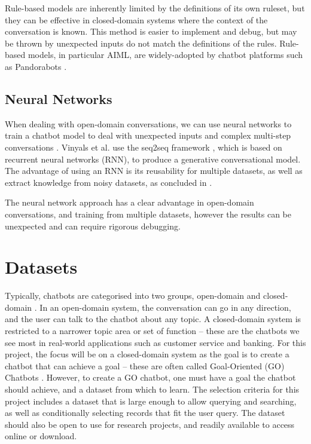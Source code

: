 Rule-based models are inherently limited by the definitions of its own ruleset, but they can be effective in closed-domain systems where the context of the conversation is known. This method is easier to implement and debug, but may be thrown by unexpected inputs do not match the definitions of the rules. Rule-based models, in particular AIML, are widely-adopted by chatbot platforms such as Pandorabots \cite{pandorabots2019about}.

\subsection{Neural Networks}
When dealing with open-domain conversations, we can use neural networks to train a chatbot model to deal with unexpected inputs and complex multi-step conversations \cite{vinyals2015neural}. Vinyals et al. use the seq2seq framework \cite{sutskever2014sequence}, which is based on recurrent neural networks (RNN), to produce a generative conversational model. The advantage of using an RNN is its reusability for multiple datasets, as well as extract knowledge from noisy datasets, as concluded in \cite{vinyals2015neural}.


The neural network approach has a clear advantage in open-domain conversations, and training from multiple datasets, however the results can be unexpected and can require rigorous debugging.

\newpage
\section{Datasets}
Typically, chatbots are categorised into two groups, open-domain and closed-domain \cite{ilievski2018building}. In an open-domain system, the conversation can go in any direction, and the user can talk to the chatbot about any topic. A closed-domain system is restricted to a narrower topic area or set of function – these are the chatbots we see most in real-world applications such as customer service and banking. For this project, the focus will be on a closed-domain system as the goal is to create a chatbot that can achieve a goal – these are often called Goal-Oriented (GO) Chatbots \cite{ilievski2018building}. However, to create a GO chatbot, one must have a goal the chatbot should achieve, and a dataset from which to learn. The selection criteria for this project includes a dataset that is large enough to allow querying and searching, as well as conditionally selecting records that fit the user query. The dataset should also be open to use for research projects, and readily available to access online or download.


